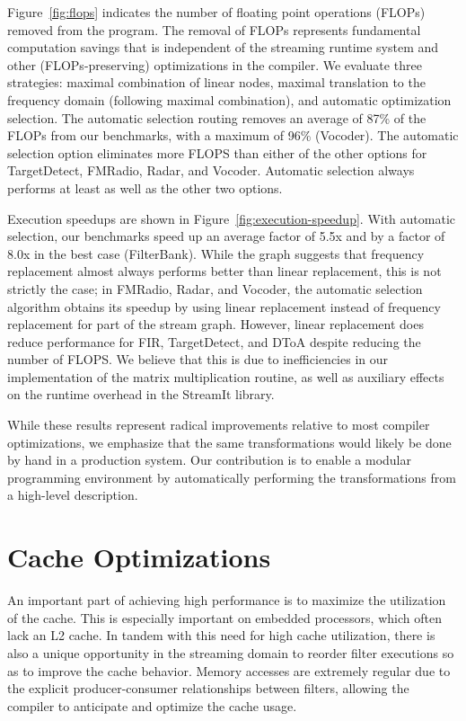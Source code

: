 Figure~\ref{fig:flops} indicates the number of floating point
operations (FLOPs) removed from the program.  The removal of FLOPs
represents fundamental computation savings that is independent of the
streaming runtime system and other (FLOPs-preserving) optimizations in
the compiler.  We evaluate three strategies: maximal combination of
linear nodes, maximal translation to the frequency domain (following
maximal combination), and automatic optimization selection.  The
automatic selection routing removes an average of 87\% of the FLOPs
from our benchmarks, with a maximum of 96\% (Vocoder).  The automatic
selection option eliminates more FLOPS than either of the other
options for TargetDetect, FMRadio, Radar, and Vocoder.  Automatic
selection always performs at least as well as the other two options.

Execution speedups are shown in Figure~\ref{fig:execution-speedup}.
With automatic selection, our benchmarks speed up an average factor of
5.5x and by a factor of 8.0x in the best case (FilterBank).  While the
graph suggests that frequency replacement almost always performs
better than linear replacement, this is not strictly the case; in
%
%
FMRadio, Radar, and Vocoder, the automatic selection algorithm obtains
its speedup by using linear replacement instead of frequency
replacement for part of the stream graph.  However, linear replacement
does reduce performance for FIR, TargetDetect, and DToA despite
reducing the number of FLOPS.  We believe that this is due to
inefficiencies in our implementation of the matrix multiplication
routine, as well as auxiliary effects on the runtime overhead in the
StreamIt library.

While these results represent radical improvements relative to most
compiler optimizations, we emphasize that the same transformations
would likely be done by hand in a production system.  Our contribution
is to enable a modular programming environment by automatically
performing the transformations from a high-level description.

\section{Cache Optimizations}

An important part of achieving high performance is to maximize the
utilization of the cache.  This is especially important on embedded
processors, which often lack an L2 cache.  In tandem with this need
for high cache utilization, there is also a unique opportunity in the
streaming domain to reorder filter executions so as to improve the
cache behavior.  Memory accesses are extremely regular due to the
explicit producer-consumer relationships between filters, allowing the
compiler to anticipate and optimize the cache usage.

